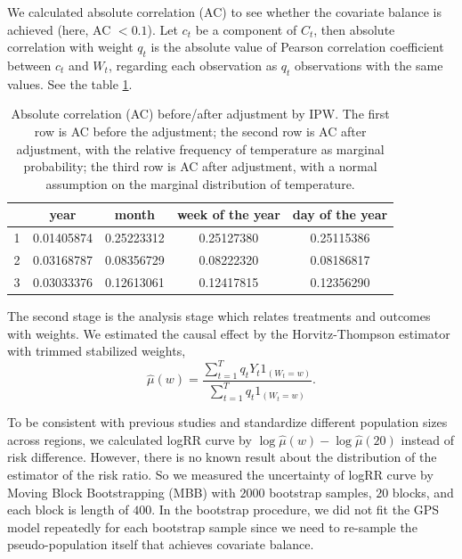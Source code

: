 \documentclass[12pt]{article}
\begin{document}
We calculated absolute correlation (AC)\cite{gpsboosting2015} 
to see whether the covariate balance is achieved (here, AC $<0.1$).
Let $c_t$ be a component of $C_t$, then absolute correlation with weight $q_t$ is
the absolute value of Pearson correlation coefficient between $c_t$ and $W_t$,
regarding each observation as $q_t$ observations with the same values.
See the table \ref{table:AC}.

\begin{table}[ht]
	\centering
\begin{tabular}{|| c || c | c | c | c || }
	\hline\hline
	\ & year & month & week of the year & day of the year \\
	\hline
	1 & 0.01405874 & 0.25223312 & 0.25127380 & 0.25115386 \\ %
	\hline
	2 & 0.03168787 & 0.08356729 & 0.08222320 & 0.08186817 \\ %
	\hline
	3 & 0.03033376 & 0.12613061 & 0.12417815 & 0.12356290 \\ %
	\hline\hline
	
\end{tabular}
\caption{
	Absolute correlation (AC) before/after adjustment by IPW.
	The first row is AC before the adjustment;
	the second row is AC after adjustment, 
	with the relative frequency of temperature as marginal probability;
	the third row is AC after adjustment, 
	with a normal assumption on the marginal distribution of temperature.}
\label{table:AC}
\end{table}

The second stage is the analysis stage which relates treatments and outcomes with weights.
We estimated the causal effect by the Horvitz-Thompson estimator with trimmed stabilized weights,
\[
	\hat{\mu}(w) = \frac{\sum_{t = 1}^T q_t Y_t 1_{(W_t = w)}}{\sum_{t = 1}^T q_t 1_{(W_t = w)}}.
\]

To be consistent with previous studies and standardize different population sizes across regions,
we calculated logRR curve by $\log\hat{\mu}(w) - \log \hat{\mu}(20)$ instead of risk difference.
However, there is no known result about the distribution of the estimator of the risk ratio.
So we measured the uncertainty of logRR curve by Moving Block Bootstrapping (MBB)\cite{mbb1989}
with $2000$ bootstrap samples, $20$ blocks, and each block is length of $400$.
In the bootstrap procedure, we did not fit the GPS model repeatedly for each bootstrap sample
since we need to re-sample the pseudo-population itself that achieves covariate balance.
\end{document}
